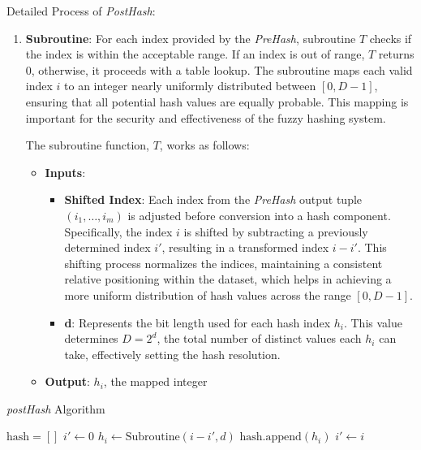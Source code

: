 Detailed Process of \textit{PostHash}:
\begin{enumerate}
    \item \textbf{Subroutine}: For each index provided by the \textit{PreHash}, subroutine \(T\) checks if the index is within the acceptable range. If an index is out of range, \(T\) returns 0, otherwise, it proceeds with a table lookup. The subroutine maps each valid index \(i\) to an integer nearly uniformly distributed between \([0, D-1]\), ensuring that all potential hash values are equally probable. This mapping is important for the security and effectiveness of the fuzzy hashing system.
    
    The subroutine function, \(T\), works as follows:
    \begin{itemize}
        \item \textbf{Inputs}: 
        \begin{itemize}
            \item \textbf{Shifted Index}: Each index from the \textit{PreHash} output tuple \((i_1, \ldots, i_m)\) is adjusted before conversion into a hash component. Specifically, the index \(i\) is shifted by subtracting a previously determined index \(i'\), resulting in a transformed index \(i - i'\). This shifting process normalizes the indices, maintaining a consistent relative positioning within the dataset, which helps in achieving a more uniform distribution of hash values across the range \([0, D-1]\).
            \item \textbf{d}: Represents the bit length used for each hash index \(h_i\). This value determines \(D = 2^d\), the total number of distinct values each \(h_i\) can take, effectively setting the hash resolution.
        \end{itemize}
        \item \textbf{Output}: \(h_i\), the mapped integer
    \end{itemize}
\end{enumerate}

\vspace{20pt}

\begin{algorithm}
    \begin{algorithmic}[1]
    \caption{\textit{postHash} Algorithm}
    \label{postHash Algorithm}
    \State $\text{hash} = []$
    \State $i' \gets 0$
        \State $h_i \gets \text{Subroutine}(i - i', d)$
        \State $\text{hash.append}(h_i)$
        \State $i' \gets i$
    \EndFor 
    \State {}
    \EndFunction
    \end{algorithmic}
    \end{algorithm}
    
